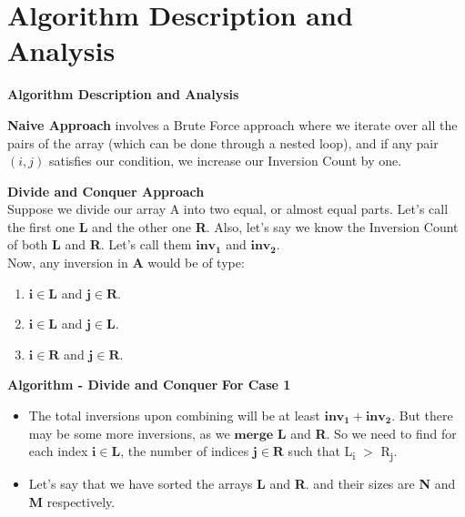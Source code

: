 \documentclass{beamer}
\begin{document}
\section{Algorithm Description and Analysis}
\begin{frame}{\textbf{Algorithm Description and Analysis}}
\begin{block}{}
\textbf{Naive Approach}
involves a Brute Force approach where we iterate over all the pairs of the array (which can be done through a nested loop), and if any pair $(i,j)$ satisfies our condition, we increase our Inversion Count by one.
\end{block}

\textbf{Divide and Conquer Approach}\\
Suppose we divide our array A into two equal, or almost equal parts. Let's call the first one \textbf{L} and the other one \textbf{R}. Also, let's say we know the Inversion Count of both \textbf{L} and \textbf{R}. Let's call them $\bm{inv_1}$ and $\bm{inv_2}$. \\
Now, any inversion in $\bm{A}$ would be of type:\\
\begin{enumerate}
  \item  $\bm{i \in L}$ and $\bm{j \in R}$.
  \item  $\bm{i \in L}$ and $\bm{j \in L}$.
  \item  $\bm{i \in R}$ and $\bm{j \in R}$.
\end {enumerate}

\end{frame}

\begin{frame}{\textbf{Algorithm - Divide and Conquer}}
\textbf{For Case 1}
\begin{itemize}
    \item The total inversions upon combining will be at least $\bm{inv_1} + \bm{inv_2}$. But there may be some more inversions, as we $\bm{merge}$ \textbf{L} and \textbf{R}. So we need to find for each index $\bm{i \in L}$, the number of indices $\bm{j \in R}$ such that L\textsubscript i $>$ R\textsubscript j.\\
    \vspace{20pt}
    \item Let's say that we have sorted the arrays \textbf{L} and \textbf{R}. and their sizes are \textbf{N} and \textbf{M} respectively. \\
\end{itemize}
\end{frame}
\end{document}
